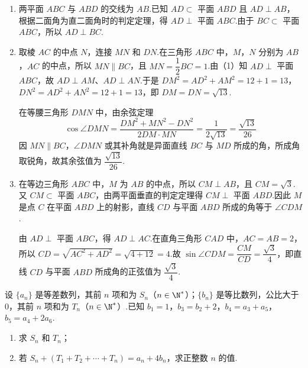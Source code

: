 \begin{solution}
\begin{enumerate}
\item 两平面 \(ABC\) 与 \(ABD\) 的交线为 \(AB\).已知 \(AD\subset\) 平面 \(ABD\) 且 \(AD\perp AB\)，根据二面角为直二面角时的判定定理，得 \(AD\perp\) 平面 \(ABC\).由于 \(BC\subset\) 平面 \(ABC\)，所以 \(AD\perp BC\).

\item 取棱 \(AC\) 的中点 \(N\)，连接 \(MN\) 和 \(DN\).在三角形 \(ABC\) 中，\(M\)，\(N\) 分别为 \(AB\)，\(AC\) 的中点，所以 \(MN\parallel BC\)，且 \(MN=\dfrac12BC=1\).由（1）知 \(AD\perp\) 平面 \(ABC\)，故 \(AD\perp AM\)、\(AD\perp AN\).于是
\(DM^2=AD^2+AM^2=12+1=13\)，\(DN^2=AD^2+AN^2=12+1=13\)，即 \(DM=DN=\sqrt{13}\).

在等腰三角形 \(DMN\) 中，由余弦定理
\[
\cos\angle DMN=\frac{DM^2+MN^2-DN^2}{2DM\cdot MN}=\frac{1}{2\sqrt{13}}=\frac{\sqrt{13}}{26}
\]
因 \(MN\parallel BC\)，\(\angle DMN\) 或其补角就是异面直线 \(BC\) 与 \(MD\) 所成的角，所成角取锐角，故其余弦值为 \(\dfrac{\sqrt{13}}{26}\).

\item 在等边三角形 \(ABC\) 中，\(M\) 为 \(AB\) 的中点，所以 \(CM\perp AB\)，且 \(CM=\sqrt3\).又 \(CM\subset\) 平面 \(ABC\)，由两平面垂直的判定定理得 \(CM\perp\) 平面 \(ABD\).因此 \(M\) 是点 \(C\) 在平面 \(ABD\) 上的射影，直线 \(CD\) 与平面 \(ABD\) 所成的角等于 \(\angle CDM\).

由 \(AD\perp\) 平面 \(ABC\)，得 \(AD\perp AC\).在直角三角形 \(CAD\) 中，\(AC=AB=2\)，所以 \(CD=\sqrt{AC^2+AD^2}=\sqrt{4+12}=4\).故
\(\sin\angle CDM=\dfrac{CM}{CD}=\dfrac{\sqrt3}{4}\)，即直线 \(CD\) 与平面 \(ABD\) 所成角的正弦值为 \(\dfrac{\sqrt3}{4}\).
\end{enumerate}
\end{solution}

\begin{problem}

设 \(\{a_n\}\) 是等差数列，其前 \(n\) 项和为 \(S_n\)（\(n\in\N^*\)）；\(\{b_n\}\) 是等比数列，公比大于 \(0\)，其前 \(n\) 项和为 \(T_n\)（\(n\in\N^*\)）.已知 \(b_1=1\)，\(b_3=b_2+2\)，\(b_4=a_3+a_5\)，\(b_5=a_4+2a_6\).

\begin{enumerate}
\item 求 \(S_n\) 和 \(T_n\)；
\item 若 \(S_n+(T_1+T_2+\cdots+T_n)=a_n+4b_n\)，求正整数 \(n\) 的值.
\end{enumerate}
\end{problem}

